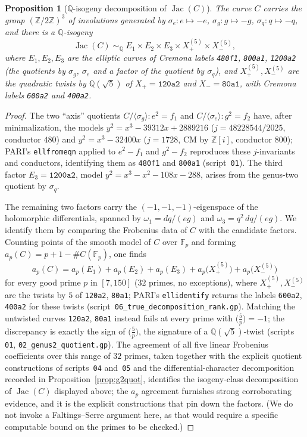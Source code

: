 \documentclass[11pt,reqno]{amsart}
\theoremstyle{plain}
\newtheorem{proposition}[theorem]{Proposition}
\theoremstyle{definition}
\newcommand{\Q}{\mathbb{Q}}
\newcommand{\Z}{\mathbb{Z}}
\newcommand{\F}{\mathbb{F}}
\DeclareMathOperator{\Jac}{Jac}
\begin{document}
\begin{proposition}[$\Q$-isogeny decomposition of $\Jac(C)$]\label{prop:decomp}
The curve $C$ carries the group $(\Z/2\Z)^3$ of involutions generated by
$\sigma_e:e\mapsto-e$, $\sigma_g:g\mapsto-g$, $\sigma_q:q\mapsto-q$, and there
is a $\Q$-isogeny
\[
\Jac(C)\;\sim_{\Q}\;E_1\times E_2\times E_3\times X_+^{(5)}\times X_-^{(5)},
\]
where $E_1,E_2,E_3$ are the elliptic curves of Cremona labels \texttt{480f1},
\texttt{800a1}, \texttt{1200a2} (the quotients by $\sigma_g$, $\sigma_e$ and a
factor of the quotient by $\sigma_q$), and $X_+^{(5)},X_-^{(5)}$ are the
quadratic twists by $\Q(\sqrt5)$ of $X_+=\texttt{120a2}$ and $X_-=\texttt{80a1}$,
with Cremona labels \texttt{600a2} and \texttt{400a2}.
\end{proposition}

\begin{proof}
The two ``axis'' quotients $C/\langle\sigma_g\rangle:e^2=f_1$ and
$C/\langle\sigma_e\rangle:g^2=f_2$ have, after minimalization, the models
$y^2=x^3-39312x+2889216$ ($j=48228544/2025$, conductor $480$) and
$y^2=x^3-32400x$ ($j=1728$, CM by $\Z[i]$, conductor $800$); PARI's
\texttt{ellfromeqn} applied to $e^2-f_1$ and $g^2-f_2$ reproduces these
$j$-invariants and conductors, identifying them as \texttt{480f1} and
\texttt{800a1} (script~\texttt{01}). The third factor $E_3=\texttt{1200a2}$,
model $y^2=x^3-x^2-108x-288$, arises from the genus-two quotient by $\sigma_q$.

The remaining two factors carry the $(-1,-1,-1)$-eigenspace of the holomorphic
differentials, spanned by $\omega_1=dq/(eg)$ and $\omega_3=q^2\,dq/(eg)$. We
identify them by comparing the Frobenius data of $C$ with the candidate
factors. Counting points of the smooth model of $C$ over $\F_p$ and forming
$a_p(C)=p+1-\#C(\F_p)$, one finds
\[
a_p(C)=a_p(E_1)+a_p(E_2)+a_p(E_3)+a_p\!\bigl(X_+^{(5)}\bigr)+a_p\!\bigl(X_-^{(5)}\bigr)
\]
for every good prime $p$ in $[7,150]$ ($32$ primes, no exceptions), where
$X_+^{(5)},X_-^{(5)}$ are the twists by $5$ of \texttt{120a2}, \texttt{80a1};
PARI's \texttt{ellidentify} returns the labels \texttt{600a2}, \texttt{400a2}
for these twists (script~\texttt{06\_true\_decomposition\_rank.gp}). Matching
the untwisted curves \texttt{120a2}, \texttt{80a1} instead fails at every prime
with $\bigl(\tfrac5p\bigr)=-1$; the discrepancy is exactly the sign of
$\bigl(\tfrac5p\bigr)$, the signature of a $\Q(\sqrt5)$-twist (scripts
\texttt{01}, \texttt{02\_genus2\_quotient.gp}). The agreement of all five linear
Frobenius coefficients over this range of $32$ primes, taken together with the
explicit quotient constructions of scripts~\texttt{04} and~\texttt{05} and the
differential-character decomposition recorded in
Proposition~\ref{prop:g2quot}, identifies the isogeny-class decomposition of
$\Jac(C)$ displayed above; the $a_p$ agreement furnishes strong corroborating
evidence, and it is the explicit constructions that pin down the factors. (We
do not invoke a Faltings--Serre argument here, as that would require a specific
computable bound on the primes to be checked.)
\end{proof}
\end{document}
